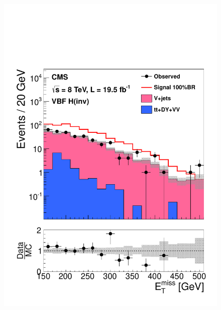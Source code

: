 \begin{figure}
  \includegraphics[width=.6\largefigwidth]{plots/prompt/AN-12-403-figs/SignalRegionMET.pdf}

\end{figure}
